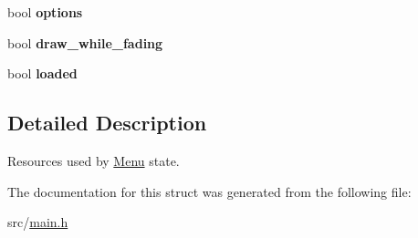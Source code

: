 \begin{DoxyCompactItemize}
\item 
\hypertarget{structMenu_a239080567caece4982b2edd716c57223}{bool {\bfseries options}}\label{structMenu_a239080567caece4982b2edd716c57223}

\item 
\hypertarget{structMenu_a06eac1cdc4ed5a50be2c34635147e150}{bool {\bfseries draw\-\_\-while\-\_\-fading}}\label{structMenu_a06eac1cdc4ed5a50be2c34635147e150}

\item 
\hypertarget{structMenu_afd245b822f2805677609fc0f78ee59ac}{bool {\bfseries loaded}}\label{structMenu_afd245b822f2805677609fc0f78ee59ac}

\end{DoxyCompactItemize}


\subsection{\-Detailed \-Description}
\-Resources used by \hyperlink{structMenu}{\-Menu} state. 

\-The documentation for this struct was generated from the following file\-:\begin{DoxyCompactItemize}
\item 
src/\hyperlink{main_8h}{main.\-h}\end{DoxyCompactItemize}
